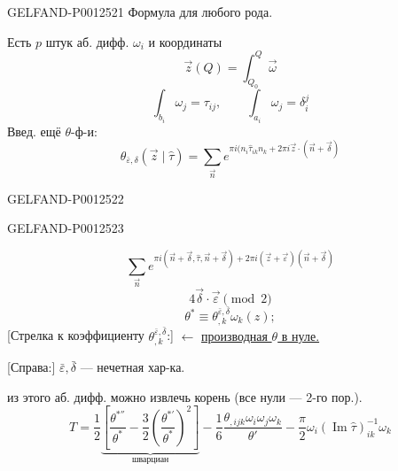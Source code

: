 \begin{GelfandAdjacentEvidence}{GELFAND-P001252}{1}
Формула для любого рода.

Есть $p$ штук аб. дифф. $\omega_i$ и координаты
\begin{equation*}
\vec z(Q)=\int_{Q_0}^{Q}\vec\omega\tag{26}
\end{equation*}
\begin{equation*}
\int_{b_i}\omega_j=\tau_{ij},\qquad
\int_{a_i}\omega_j=\delta_i^j\tag{27}
\end{equation*}
Введ. ещё $\theta$-ф-и:
\begin{equation*}
\theta_{\bar\varepsilon,\delta}(\vec z\mid\hat\tau)
=\sum_{\vec n}e^{\pi i\bigl(n_i\hat\tau_{ik}n_k
+2\pi i\vec z\cdot(\vec n+\vec\delta)}
\end{equation*}
\end{GelfandAdjacentEvidence}
\begin{GelfandAdjacentEvidence}{GELFAND-P001252}{2}

\end{GelfandAdjacentEvidence}
\begin{GelfandAdjacentEvidence}{GELFAND-P001252}{3}

\begin{equation*}
\sum_{\vec n}e^{\pi i(\vec n+\vec\delta,\hat\tau,\vec n+\vec\delta)
+2\pi i(\vec z+\vec\varepsilon)(\vec n+\vec\delta)}
\end{equation*}
\begin{equation*}
4\vec\delta\cdot\vec\varepsilon\pmod 2
\end{equation*}
\begin{equation*}
\theta^*\equiv\theta^{\bar\varepsilon,\bar\delta}_{,k}\omega_k(z);
\end{equation*}
[Стрелка к коэффициенту $\theta^{\bar\varepsilon,\bar\delta}_{,k}$:]
$\longleftarrow$ \underline{производная $\theta$ в нуле.}

[Справа:] $\bar\varepsilon,\bar\delta$ — нечетная хар-ка.

из этого аб. дифф. можно извлечь корень (все нули — 2-го пор.).
\begin{equation*}
T=\frac12
\underbrace{\left[\frac{\theta^{*''}}{\theta^*}
-\frac32\left(\frac{\theta^{*'}}{\theta^*}\right)^2\right]}_{\text{шварциан}}
-\frac16\frac{\theta_{,ijk}\omega_i\omega_j\omega_k}{\theta'}
-\frac\pi2\omega_i(\operatorname{Im}\hat\tau)^{-1}_{ik}\omega_k
\tag{28}
\end{equation*}
\end{GelfandAdjacentEvidence}



